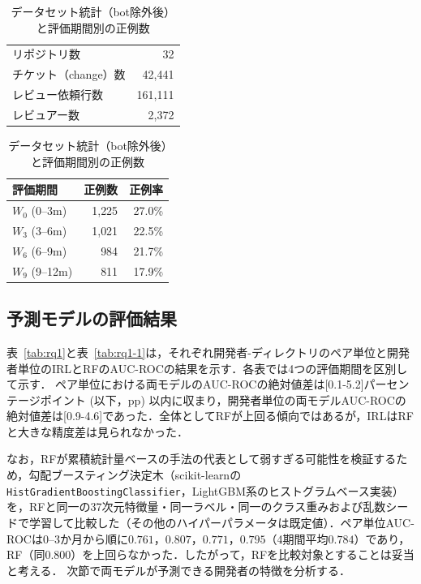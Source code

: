 \documentclass[submit,noauthor,ses,dvipdfmx]{ipsj}
\begin{document}
\begin{table}[t]
\caption{データセット統計（bot除外後）と評価期間別の正例数}
\label{tab:dataset}
\centering
\footnotesize
\begin{tabular}{lr}
\hline
リポジトリ数 & 32 \\
チケット（change）数 & 42{,}441 \\
レビュー依頼行数 & 161{,}111 \\
レビュアー数 & 2{,}372 \\
\hline
\end{tabular}
\hspace{2mm}
\begin{tabular}{lrr}
\hline
評価期間 & 正例数 & 正例率 \\
\hline
$W_0$ (0--3m) & 1{,}225 & 27.0\% \\
$W_3$ (3--6m) & 1{,}021 & 22.5\% \\
$W_6$ (6--9m) & 984 & 21.7\% \\
$W_9$ (9--12m) & 811 & 17.9\% \\
\hline
\end{tabular}
\end{table}

\vspace{-2mm}
\subsection{予測モデルの評価結果}

表~\ref{tab:rq1}と表~\ref{tab:rq1-1}は，それぞれ開発者-ディレクトリのペア単位と開発者単位のIRLとRFのAUC-ROCの結果を示す．各表では4つの評価期間を区別して示す．
ペア単位における両モデルのAUC-ROCの絶対値差は[0.1-5.2]パーセンテージポイント (以下，pp) 以内に収まり，開発者単位の両モデルAUC-ROCの絶対値差は[0.9-4.6]であった．全体としてRFが上回る傾向ではあるが，IRLはRFと大きな精度差は見られなかった．

なお，RFが累積統計量ベースの手法の代表として弱すぎる可能性を検証するため，勾配ブースティング決定木（scikit-learnの\texttt{HistGradientBoostingClassifier}，LightGBM系のヒストグラムベース実装）を，RFと同一の37次元特徴量・同一ラベル・同一のクラス重みおよび乱数シードで学習して比較した（その他のハイパーパラメータは既定値）．ペア単位AUC-ROCは0--3か月から順に$0.761$，$0.807$，$0.771$，$0.795$（4期間平均$0.784$）であり，RF（同$0.800$）を上回らなかった．したがって，RFを比較対象とすることは妥当と考える．
次節で両モデルが予測できる開発者の特徴を分析する．
\end{document}
